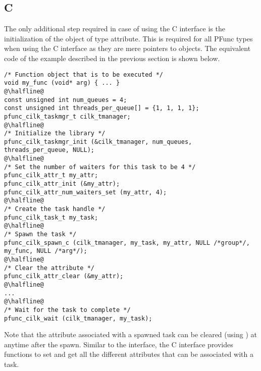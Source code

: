 \subsection{C}
The only additional step required in case of using the C interface is the 
initialization of the object of type attribute. 
%
This is required for all PFunc types when using the C interface as they are
mere pointers to \Cpp{} objects.
%
The equivalent code of the \Cpp{} example described in the previous section 
is shown below. 
%
\begin{lstlisting}
/* Function object that is to be executed */
void my_func (void* arg) { ... }
@\halfline@
const unsigned int num_queues = 4; 
const unsigned int threads_per_queue[] = {1, 1, 1, 1}; 
pfunc_cilk_taskmgr_t cilk_tmanager;
@\halfline@
/* Initialize the library */
pfunc_cilk_taskmgr_init (&cilk_tmanager, num_queues, threads_per_queue, NULL);
@\halfline@
/* Set the number of waiters for this task to be 4 */
pfunc_cilk_attr_t my_attr;
pfunc_cilk_attr_init (&my_attr);
pfunc_cilk_attr_num_waiters_set (my_attr, 4);
@\halfline@
/* Create the task handle */
pfunc_cilk_task_t my_task;
@\halfline@
/* Spawn the task */
pfunc_cilk_spawn_c (cilk_tmanager, my_task, my_attr, NULL /*group*/, my_func, NULL /*arg*/);
@\halfline@
/* Clear the attribute */
pfunc_cilk_attr_clear (&my_attr);
@\halfline@
...
@\halfline@
/* Wait for the task to complete */
pfunc_cilk_wait (cilk_tmanager, my_task);
\end{lstlisting}

Note that the attribute associated with a spawned task can be cleared (using
) at anytime after the spawn. 
%
Similar to the \Cpp{} interface, the C interface provides functions to set and
get all the different attributes that can be associated with a task.

